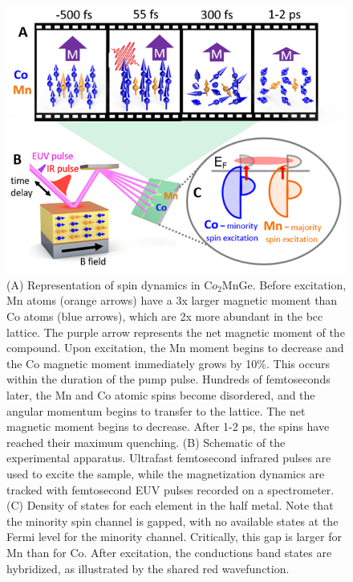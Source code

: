 \begin{figure}
\label{fig: Heus1}
\begin{center}
	\includegraphics[width=150mm]{figs/Heus1}
\end{center}
\caption{(A) Representation of spin dynamics in C$o_2$MnGe. Before excitation, Mn atoms (orange arrows) have a 3x larger magnetic moment than Co atoms (blue arrows), which are 2x more abundant in the bcc lattice. The purple arrow represents the net magnetic moment of the compound. Upon excitation, the Mn moment begins to decrease and the Co magnetic moment immediately grows by 10\%. This occurs within the duration of the pump pulse. Hundreds of femtoseconds later, the Mn and Co atomic spins become disordered, and the angular momentum begins to transfer to the lattice. The net magnetic moment begins to decrease. After 1-2 ps, the spins have reached their maximum quenching. (B) Schematic of the experimental apparatus. Ultrafast femtosecond infrared pulses are used to excite the sample, while the magnetization dynamics are tracked with femtosecond EUV pulses recorded on a spectrometer. (C) Density of states for each element in the half metal. Note that the minority spin channel is gapped, with no available states at the Fermi level for the minority channel. Critically, this gap is larger for Mn than for Co. After excitation, the conductions band states are hybridized, as illustrated by the shared red wavefunction.}
\end{figure}

